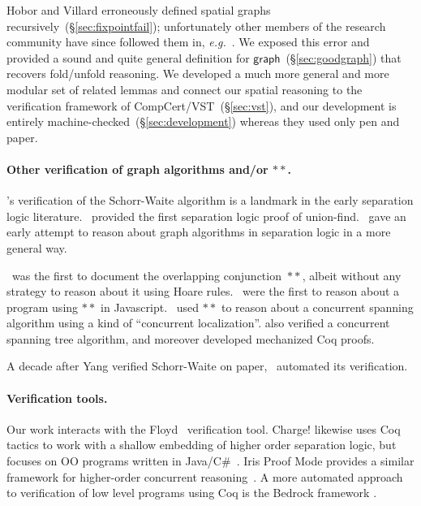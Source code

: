 \documentclass[acmsmall,review,anonymous]{acmart}\settopmatter{printfolios=true,printccs=false,printacmref=false}
\newcommand{\p}[1]{\ensuremath{\mathsf{#1}}} \newcommand{\m}[1]{\ensuremath{\mathit{#1}}} \newcommand{\ma}[1]{\ensuremath{\mathcal{#1}}} \let\ramify\lightning
\begin{document}
Hobor and Villard erroneously defined spatial graphs
recursively~(\S\ref{sec:fixpointfail}); unfortunately other members of the research
community have since followed them in, \emph{e.g.}~\cite{raadvg15}.  We exposed this
error and provided a sound and quite general definition for
\p{graph}~(\S\ref{sec:goodgraph}) that recovers fold/unfold reasoning.  We developed a
much more general and more modular set of related lemmas and connect our spatial
reasoning to the verification framework of CompCert/VST~(\S\ref{sec:vst}), and
our development is entirely
machine-checked~(\S\ref{sec:development}) whereas they used only pen and paper.

\fi


\paragraph{Other verification of graph algorithms and/or $**$.}
\cite{hongseok:phd}'s verification of the Schorr-Waite algorithm is a landmark in the
early separation logic literature.  \cite{neelthesis}~provided the first separation
logic proof of union-find.  \cite{bornat:aliasing04}~gave an early attempt to
reason about graph algorithms in separation logic in a more general
way.

\cite{rey-slnotes}~was the first to document the overlapping conjunction~$**$, albeit without
any strategy to reason about it using Hoare rules.
\cite{gardnerms12}~were the first to reason about a program using $**$ in
Javascript.  \cite{raadvg15}~used $**$ to reason about a
concurrent spanning algorithm using a kind of
``concurrent localization''.  \cite{ilya-graphs} also verified a
concurrent spanning tree algorithm, and moreover developed mechanized Coq proofs.

A decade after Yang verified Schorr-Waite on paper, \cite{leino10}~automated
its verification.



\vspace{-1ex}
\paragraph{Verification tools.}
Our work interacts with the Floyd~\cite{appel:programlogics} verification
tool.  Charge! likewise uses Coq tactics to work with a shallow embedding of higher
order separation logic, but focuses on OO programs written in
Java/C\#~\cite{bengtson:charge}.  Iris Proof Mode provides a similar framework for higher-order
concurrent reasoning~\cite{krebbers:iris}.  A  more automated approach to verification of low
level programs using Coq is the Bedrock framework \cite{chlipala:bedrock}.
\end{document}
